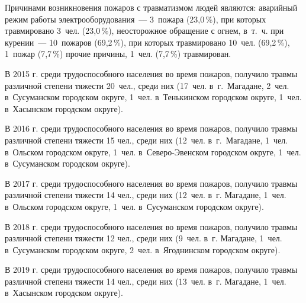 Причинами возникновения пожаров с травматизмом людей являются: аварийный режим работы электрооборудования~--- 3~пожара (23,0\,\%), при которых травмировано 3~чел. (23,0\,\%), неосторожное обращение с огнем, в~т.~ч. при курении~--- 10~пожаров (69,2\,\%), при которых травмировано 10~чел. (69,2\,\%), 1~пожар (7,7\,\%) прочие причины, 1~чел. (7,7\,\%) травмирован.

В 2015 г. среди трудоспособного населения во время пожаров, получило травмы различной степени тяжести 20~чел., среди них (17~чел. в~г.~Магадане, 2~чел. в~Сусуманском городском округе, 1~чел. в~Тенькинском городском округе, 1~чел. в~Хасынском городском округе).

В 2016 г. среди трудоспособного населения во время пожаров, получило травмы различной степени тяжести 15 чел., среди них (12~чел. в~г.~Магадане, 1~чел. в~Ольском городском округе, 1~чел. в~Северо-Эвенском городском округе, 1~чел. в~Сусуманском городском округе).

В 2017 г. среди трудоспособного населения во время пожаров, получило травмы различной степени тяжести 14 чел., среди них (12~чел. в~г. Магадане, 1~чел. в~Ольском городском округе, 1~чел. в~Сусуманском городском округе).

В 2018 г. среди трудоспособного населения во время пожаров, получило травмы различной степени тяжести 12 чел., среди них (9~чел. в~г. Магадане, 1~чел. в~Сусуманском городском округе, 2~чел. в~Ягоднинском городском округе).

В 2019 г. среди трудоспособного населения во время пожаров, получило травмы различной степени тяжести 14 чел., среди них (13~чел. в~г. Магадане, 1~чел. в~Хасынском городском округе).

